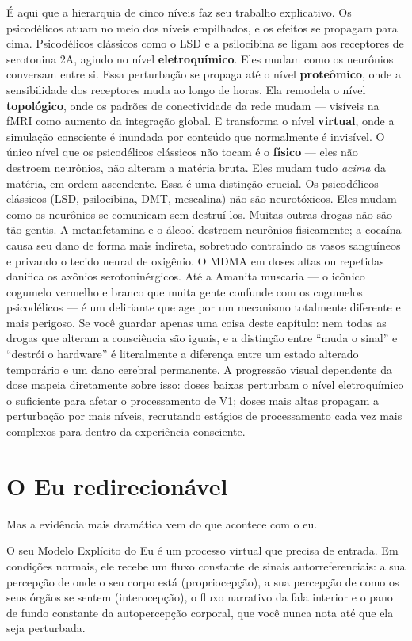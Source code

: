 \documentclass[11pt, twoside, openright]{book}
\begin{document}
É aqui que a hierarquia de cinco níveis faz seu trabalho explicativo. Os psicodélicos atuam no meio dos níveis empilhados, e os efeitos se propagam para cima. Psicodélicos clássicos como o LSD e a psilocibina se ligam aos receptores de serotonina 2A, agindo no nível \textbf{eletroquímico}. Eles mudam como os neurônios conversam entre si. Essa perturbação se propaga até o nível \textbf{proteômico}, onde a sensibilidade dos receptores muda ao longo de horas. Ela remodela o nível \textbf{topológico}, onde os padrões de conectividade da rede mudam --- visíveis na fMRI como aumento da integração global. E transforma o nível \textbf{virtual}, onde a simulação consciente é inundada por conteúdo que normalmente é invisível. O único nível que os psicodélicos clássicos não tocam é o \textbf{físico} --- eles não destroem neurônios, não alteram a matéria bruta. Eles mudam tudo \textit{acima} da matéria, em ordem ascendente. Essa é uma distinção crucial. Os psicodélicos clássicos (LSD, psilocibina, DMT, mescalina) não são neurotóxicos. Eles mudam como os neurônios se comunicam sem destruí-los. Muitas outras drogas não são tão gentis. A metanfetamina e o álcool destroem neurônios fisicamente; a cocaína causa seu dano de forma mais indireta, sobretudo contraindo os vasos sanguíneos e privando o tecido neural de oxigênio. O MDMA em doses altas ou repetidas danifica os axônios serotoninérgicos. Até a Amanita muscaria --- o icônico cogumelo vermelho e branco que muita gente confunde com os cogumelos psicodélicos --- é um deliriante que age por um mecanismo totalmente diferente e mais perigoso. Se você guardar apenas uma coisa deste capítulo: nem todas as drogas que alteram a consciência são iguais, e a distinção entre ``muda o sinal'' e ``destrói o hardware'' é literalmente a diferença entre um estado alterado temporário e um dano cerebral permanente. A progressão visual dependente da dose mapeia diretamente sobre isso: doses baixas perturbam o nível eletroquímico o suficiente para afetar o processamento de V1; doses mais altas propagam a perturbação por mais níveis, recrutando estágios de processamento cada vez mais complexos para dentro da experiência consciente.

\section*{O Eu redirecionável}

Mas a evidência mais dramática vem do que acontece com o eu.

O seu Modelo Explícito do Eu é um processo virtual que precisa de entrada. Em condições normais, ele recebe um fluxo constante de sinais autorreferenciais: a sua percepção de onde o seu corpo está (propriocepção), a sua percepção de como os seus órgãos se sentem (interocepção), o fluxo narrativo da fala interior e o pano de fundo constante da autopercepção corporal, que você nunca nota até que ela seja perturbada.
\end{document}
